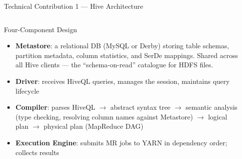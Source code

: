 \documentclass[aspectratio=169,10pt]{beamer}
\begin{document}
\begin{frame}{Technical Contribution 1 — Hive Architecture}
  \begin{columns}[T]
      \begin{block}{Four-Component Design}
        \begin{itemize}
          \item \textbf{Metastore}: a relational DB (MySQL or Derby)
                storing table schemas, partition metadata, column
                statistics, and SerDe mappings.
                Shared across all Hive clients — the ``schema-on-read''
                catalogue for HDFS files.
          \item \textbf{Driver}: receives HiveQL queries, manages
                the session, maintains query lifecycle
          \item \textbf{Compiler}: parses HiveQL $\to$ abstract syntax
                tree $\to$ semantic analysis (type checking, resolving
                column names against Metastore) $\to$ logical plan
                $\to$ physical plan (MapReduce DAG)
          \item \textbf{Execution Engine}: submits MR jobs to YARN
                in dependency order; collects results
        \end{itemize}
      \end{block}

      \begin{center}
\end{center}
\end{columns}
\end{frame}
\end{document}

